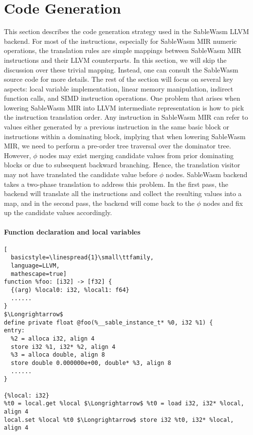 \section{Code Generation}

This section describes the code generation strategy used in the SableWasm LLVM
backend. For most of the instructions, especially for SableWasm MIR numeric
operations, the translation rules are simple mappings between SableWasm MIR
instructions and their LLVM counterparts. In this section, we will skip the
discussion over these trivial mapping. Instead, one can consult the SableWasm
source code for more details. The rest of the section will focus on several
key aspects: local variable implementation, linear memory manipulation,
indirect function calls, and SIMD instruction operations. One problem that
arises when lowering SableWasm MIR into LLVM intermediate representation is
how to pick the instruction translation order. Any instruction in SableWasm MIR
can refer to values either generated by a previous instruction in the same basic
block or instructions within a dominating block, implying that when lowering
SableWasm MIR, we need to perform a pre-order tree traversal over the dominator
tree. However, $\phi$ nodes may exist merging candidate values from prior
dominating blocks or due to subsequent backward branching.
Hence, the translation visitor may not have translated the candidate value
before $\phi$ nodes. SableWasm backend takes a two-phase translation to address
this problem. In the first pass, the backend will translate all the instructions
and collect the resulting values into a map, and in the second pass, the backend
will come back to the $\phi$ nodes and fix up the candidate values accordingly.

\paragraph{Function declaration and local variables} \quad
\begin{lstlisting}[
  basicstyle=\linespread{1}\small\ttfamily, 
  language=LLVM, 
  mathescape=true]
function %foo: [i32] -> [f32] {
  {(arg) %local0: i32, %local1: f64} 
  ......
}
$\Longrightarrow$
define private float @foo(%__sable_instance_t* %0, i32 %1) {
entry:
  %2 = alloca i32, align 4
  store i32 %1, i32* %2, align 4
  %3 = alloca double, align 8
  store double 0.000000e+00, double* %3, align 8
  ......
}

{%local: i32} 
%t0 = local.get %local $\Longrightarrow$ %t0 = load i32, i32* %local, align 4
local.set %local %t0 $\Longrightarrow$ store i32 %t0, i32* %local, align 4
\end{lstlisting}

